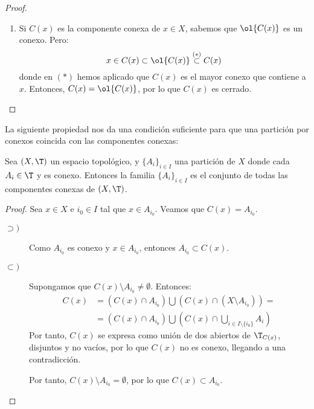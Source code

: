 \begin{proof}
\begin{enumerate}
        \item Si $C(x)$ es la componente conexa de $x\in X$, sabemos que $\ol{C(x)}$ es un conexo. Pero:
        \begin{equation*}
            x\in C(x)\subset \ol{C(x)} \stackrel{(\ast)}{\subset} C(x)
        \end{equation*}
        donde en $(\ast)$ hemos aplicado que $C(x)$ es el mayor conexo que contiene a $x$. Entonces, $C(x)=\ol{C(x)}$, por lo que $C(x)$ es cerrado.
    \end{enumerate}
\end{proof}

La siguiente propiedad nos da una condición suficiente para que una partición por conexos coincida con las componentes conexas:
\begin{prop}\label{prop:ParticionConexosAbiertos}
    Sea $(X,\T)$ un espacio topológico, y $\{A_i\}_{i\in I}$ una partición de $X$ donde cada $A_i\in \T$ y es conexo. Entonces la familia ${\{A_i\}}_{i\in I}$ es el conjunto de todas las componentes conexas de $(X,\T)$.
\end{prop}
\begin{proof}
    Sea $x\in X$ e $i_0\in I$ tal que $x\in A_{i_0}$. Veamos que $C(x)=A_{i_0}$.
    \begin{description}
        \item[$\supset)$] Como $A_{i_0}$ es conexo y $x\in A_{i_0}$, entonces $A_{i_0}\subset C(x)$.
        \item[$\subset)$] Supongamos que $C(x)\setminus A_{i_0}\neq \emptyset$. Entonces:
        \begin{align*}
            C(x) &= (C(x)\cap A_{i_0}) \bigcup \left(C(x)\cap (X\setminus A_{i_0})\right) =\\
            &= (C(x)\cap A_{i_0}) \bigcup \left(C(x)\cap \bigcup_{i\in I\setminus \{i_0\}}A_i\right)
        \end{align*}
        Por tanto, $C(x)$ se expresa como unión de dos abiertos de $\T_{C(x)}$, disjuntos y no vacíos, por lo que $C(x)$ no es conexo, llegando a una contradicción.
        
        Por tanto, $C(x)\setminus A_{i_0}=\emptyset$, por lo que $C(x)\subset A_{i_0}$.
    \end{description}
\end{proof}

